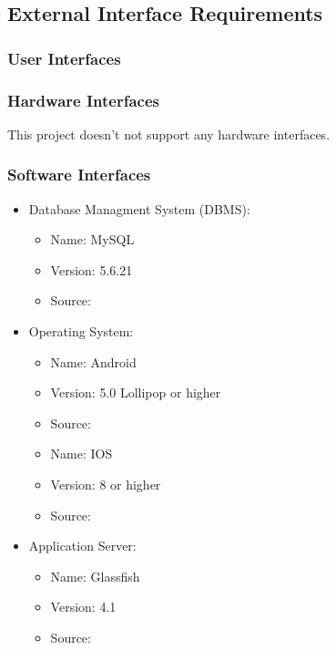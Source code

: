 \subsection{External Interface Requirements}
\subsubsection{User Interfaces}


\clearpage
\subsubsection{Hardware Interfaces}
This project doesn't not support any hardware interfaces.

\subsubsection{Software Interfaces}
\begin{itemize}
\item Database Managment System (DBMS):
	\begin{itemize}
	\item Name: MySQL
	\item Version: 5.6.21
	\item Source: {\href{https://www.mysql.com}		{\color{Black}{https://www.mysql.com}}}
	\end{itemize}
\item Operating System:
	\begin{itemize}
	\item Name: Android
	\item Version: 5.0 Lollipop or higher
	\item Source: {\href{https://www.android.com/}		{\color{Black}{https://www.android.com/}}}
	\end{itemize}
	\begin{itemize}
	\item Name: IOS
	\item Version: 8 or higher
	\item Source: {\href{https://www.apple.com/ios}		{\color{Black}{https://www.apple.com/ios}}}
	\end{itemize} 
\item Application Server:
	\begin{itemize}
	\item Name: Glassfish
	\item Version: 4.1
	\item Source: {\href{https://javaee.github.io/glassfish/}		{\color{Black}{https://javaee.github.io/glassfish/}}}
	\end{itemize}
	
\end{itemize}

